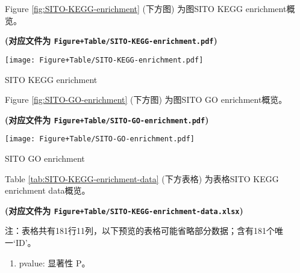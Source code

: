 \documentclass[
]{article}
\providecommand{\tightlist}{%
  \setlength{\itemsep}{0pt}\setlength{\parskip}{0pt}}
\begin{document}
Figure \ref{fig:SITO-KEGG-enrichment} (下方图) 为图SITO KEGG enrichment概览。

\textbf{(对应文件为 \texttt{Figure+Table/SITO-KEGG-enrichment.pdf})}

\def\@captype{figure}
\begin{center}
\texttt{[image: Figure+Table/SITO-KEGG-enrichment.pdf]}
\caption{SITO KEGG enrichment}\label{fig:SITO-KEGG-enrichment}
\end{center}

Figure \ref{fig:SITO-GO-enrichment} (下方图) 为图SITO GO enrichment概览。

\textbf{(对应文件为 \texttt{Figure+Table/SITO-GO-enrichment.pdf})}

\def\@captype{figure}
\begin{center}
\texttt{[image: Figure+Table/SITO-GO-enrichment.pdf]}
\caption{SITO GO enrichment}\label{fig:SITO-GO-enrichment}
\end{center}

Table \ref{tab:SITO-KEGG-enrichment-data} (下方表格) 为表格SITO KEGG enrichment data概览。

\textbf{(对应文件为 \texttt{Figure+Table/SITO-KEGG-enrichment-data.xlsx})}

\begin{center}\begin{tcolorbox}[colback=gray!10, colframe=gray!50, width=0.9\linewidth, arc=1mm, boxrule=0.5pt]注：表格共有181行11列，以下预览的表格可能省略部分数据；含有181个唯一`ID'。
\end{tcolorbox}
\end{center}
\begin{center}\begin{tcolorbox}[colback=gray!10, colframe=gray!50, width=0.9\linewidth, arc=1mm, boxrule=0.5pt]\begin{enumerate}\tightlist
\item pvalue:  显著性 P。
\end{enumerate}\end{tcolorbox}
\end{center}
\end{document}

